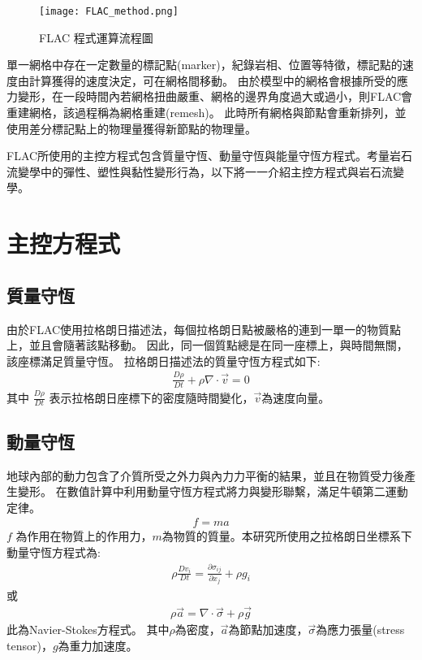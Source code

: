\begin{figure*}[ht!]
    \centering
    \texttt{[image: FLAC\_method.png]}
    \caption{FLAC 程式運算流程圖
    }
    \label{fig::FLAC_method}
\end{figure*}
單一網格中存在一定數量的標記點(marker)，紀錄岩相、位置等特徵，標記點的速度由計算獲得的速度決定，可在網格間移動。
由於模型中的網格會根據所受的應力變形，在一段時間內若網格扭曲嚴重、網格的邊界角度過大或過小，則FLAC會重建網格，該過程稱為網格重建(remesh)。
此時所有網格與節點會重新排列，並使用差分標記點上的物理量獲得新節點的物理量。

FLAC所使用的主控方程式包含質量守恆、動量守恆與能量守恆方程式。考量岩石流變學中的彈性、塑性與黏性變形行為，以下將一一介紹主控方程式與岩石流變學。
\section{主控方程式}

\subsection{質量守恆}
由於FLAC使用拉格朗日描述法，每個拉格朗日點被嚴格的連到一單一的物質點上，並且會隨著該點移動。
因此，同一個質點總是在同一座標上，與時間無關，該座標滿足質量守恆。
拉格朗日描述法的質量守恆方程式如下:
\begin{align}
\frac{D\rho}{Dt}+\rho\nabla\cdot\vec v =0 
\label{eqn:MASS_Lagrangian}
\end{align}
其中 $\frac{D\rho}{Dt}$ 表示拉格朗日座標下的密度隨時間變化，$\vec v$為速度向量。

\subsection{動量守恆}
地球內部的動力包含了介質所受之外力與內力力平衡的結果，並且在物質受力後產生變形。
在數值計算中利用動量守恆方程式將力與變形聯繫，滿足牛頓第二運動定律。
\begin{align}
f=ma
\end{align}
$f$ 為作用在物質上的作用力，$m$為物質的質量。本研究所使用之拉格朗日坐標系下動量守恆方程式為:
\begin{align}
\rho \frac{ Dv_{i}}{Dt} = \frac{\partial \sigma_{ij}}{\partial x_j}+\rho g_i\label{eqn:momentum Lagrangian}
\end{align}
或
\begin{align}
\rho \vec a = \nabla\cdot\vec\sigma+\rho\vec g\label{eqn:momentum Lagrangian2}
\end{align}
此為Navier-Stokes方程式。 其中$\rho$為密度，$\vec a$為節點加速度，$\vec\sigma$為應力張量(stress tensor)，$g$為重力加速度。

